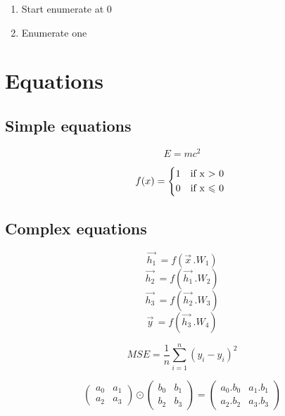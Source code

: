 \documentclass{article} %
\begin{document}
\begin{enumerate}\addtocounter{enumi}{-1}
	  \item Start enumerate at 0
	  \item Enumerate one
\end{enumerate}

\section{Equations}

\subsection{Simple equations}

\begin{equation}
	E=mc^2
\end{equation}

\begin{equation}
	f(x) =
	\begin{cases*}
		1 & if x $>$ 0\\
 		0 & if x $\leqslant$ 0
 	 \end{cases*}
\end{equation}

\subsection{Complex equations}

\begin{equation}\label{eq:layers}
	\vec{h_1}^{\,} = f(\vec{x}^{\,}.W_1)
\end{equation}
	$$\vec{h_2}^{\,} = f(\vec{h_1}^{\,}.W_2)$$
	$$\vec{h_3}^{\,} = f(\vec{h_2}^{\,}.W_3)$$
	$$\vec{y}^{\,} = f(\vec{h_3}^{\,}.W_4)$$

\begin{equation}\label{eq:mse}
	MSE=\frac{1}{n}\sum_{i=1}^{n}(y_{i}-\hat{y}_{i})^2
\end{equation}

$$
\begin{pmatrix} a_0 & a_1\\ a_2 & a_3 \end{pmatrix}
\odot
\begin{pmatrix} b_0 & b_1\\ b_2 & b_3 \end{pmatrix}
=
\begin{pmatrix} a_0.b_0 & a_1.b_1\\ a_2.b_2 & a_3.b_3 \end{pmatrix}
$$
\end{document}
